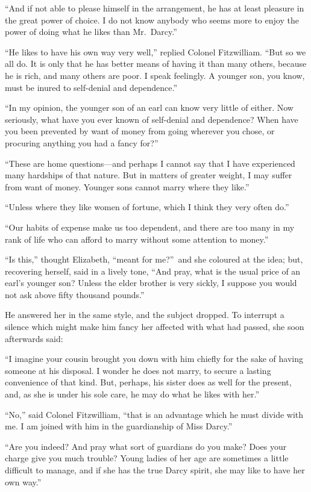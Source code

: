 \documentclass[12pt,english]{book}
\begin{document}
{}``And if not able to please himself in the arrangement, he has
at least pleasure in the great power of choice. I do not know anybody
who seems more to enjoy the power of doing what he likes than Mr.\ Darcy.''

{}``He likes to have his own way very well,'' replied Colonel Fitzwilliam.
{}``But so we all do. It is only that he has better means of having
it than many others, because he is rich, and many others are poor.
I speak feelingly. A younger son, you know, must be inured to self-denial
and dependence.''

{}``In my opinion, the younger son of an earl can know very little
of either. Now seriously, what have you ever known of self-denial
and dependence? When have you been prevented by want of money from
going wherever you chose, or procuring anything you had a fancy for?''\ 

{}``These are home questions\mbox{---}and perhaps I cannot say that
I have experienced many hardships of that nature. But in matters of
greater weight, I may suffer from want of money. Younger sons cannot
marry where they like.''

{}``Unless where they like women of fortune, which I think they very
often do.''

{}``Our habits of expense make us too dependent, and there are too
many in my rank of life who can afford to marry without some attention
to money.''

{}``Is this,'' thought Elizabeth, {}``meant for me?''\ and she
coloured at the idea; but, recovering herself, said in a lively tone,
{}``And pray, what is the usual price of an earl's younger son? Unless
the elder brother is very sickly, I suppose you would not ask above
fifty thousand pounds.''

He answered her in the same style, and the subject dropped. To interrupt
a silence which might make him fancy her affected with what had passed,
she soon afterwards said:

{}``I imagine your cousin brought you down with him chiefly for the
sake of having someone at his disposal. I wonder he does not marry,
to secure a lasting convenience of that kind. But, perhaps, his sister
does as well for the present, and, as she is under his sole care,
he may do what he likes with her.''

{}``No,'' said Colonel Fitzwilliam, {}``that is an advantage which
he must divide with me. I am joined with him in the guardianship of
Miss Darcy.''

{}``Are you indeed? And pray what sort of guardians do you make?
Does your charge give you much trouble? Young ladies of her age are
sometimes a little difficult to manage, and if she has the true Darcy
spirit, she may like to have her own way.''
\end{document}
